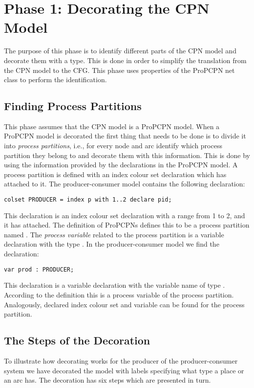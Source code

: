 \section{Phase 1: Decorating the CPN Model}
\label{sec:cpntodcpn}
The purpose of this phase is to identify different parts of the CPN model and decorate them with a type. This is done in order to simplify the translation from the CPN model to the CFG. This phase uses properties of the ProPCPN net class to perform the identification.

\subsection{Finding Process Partitions}
This phase assumes that the CPN model is a ProPCPN model. When a ProPCPN model is decorated the first thing that needs to be done is to divide it into \emph{process partitions}, i.e., for every node and arc identify which process partition they belong to and decorate them with this information. This is done by using the information provided by the declarations in the ProPCPN model. A process partition is defined with an index colour set declaration which has  attached to it. The producer-consumer model contains the following declaration:

\begin{verbatim}
colset PRODUCER = index p with 1..2 declare pid;
\end{verbatim}
 
This declaration is an index colour set declaration with a range from 1 to 2, and it has   attached. The definition of ProPCPNs defines this to be a process partition named . The \emph{process variable} related to the process partition is a variable declaration with the type . In the producer-consumer model we find the declaration:

\begin{verbatim}
var prod : PRODUCER;
\end{verbatim}

This declaration is a variable declaration with the variable name  of type . According to the definition this is a process variable of the  process partition. Analogously, declared index colour set and variable can be found for the  process partition.

\subsection{The Steps of the Decoration}
To illustrate how decorating works for the producer of the producer-consumer system we have decorated the model with labels specifying what type a place or an arc has. The decoration has six steps which are presented in turn.

